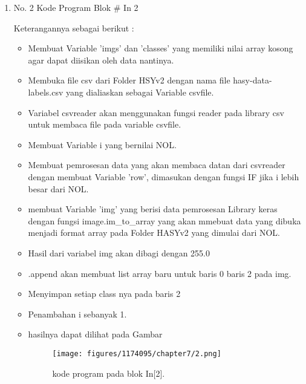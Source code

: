 \begin{enumerate}
\item No. 2 Kode Program Blok \# In 2
\par 
Keterangannya sebagai berikut :
\begin{itemize}
\item Membuat Variable 'imgs' dan 'classes' yang memiliki nilai array kosong agar dapat diisikan oleh data nantinya.
\item Membuka file csv dari Folder HSYv2 dengan nama file hasy-data-labels.csv yang dialiaskan sebagai Variable csvfile.
\item Variabel csvreader akan menggunakan fungsi reader pada library csv untuk membaca file pada variable csvfile.
\item Membuat Variable i yang bernilai NOL.
\item Membuat pemrosesan data yang akan membaca datan dari csvreader dengan membuat Variable 'row', dimasukan dengan fungsi IF jika i lebih besar dari NOL.
\item membuat Variable 'img' yang berisi data pemrosesan Library keras dengan fungsi image.im\_to\_array yang akan mmebuat data yang dibuka menjadi format array pada Folder HASYv2 yang dimulai dari NOL.
\item Hasil dari variabel img akan dibagi dengan 255.0
\item .append akan membuat list array baru untuk baris 0 baris 2 pada img.
\item Menyimpan setiap class nya  pada baris 2
\item Penambahan i sebanyak 1. 
\item hasilnya dapat dilihat pada Gambar
\begin{figure}[H]
    \texttt{[image: figures/1174095/chapter7/2.png]}
    \centering
    \caption{kode program pada blok  In[2].}
    \end{figure}
\end{itemize}




\end{enumerate}
